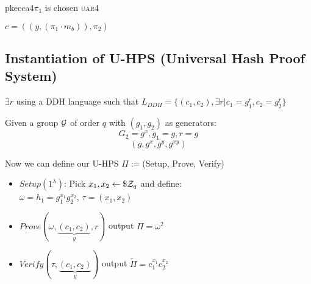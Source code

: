 \begin{cryptogame}{pkecca4}{$\pi_1$ is chosen \textsc{uar}}{4}

    \send{}{}{}
    \receive{}{}{}

    \postlevel

    {$c = ((y, (\pi_1 \cdot m_b)), \pi_2)$}{}

    \postlevel

    \send{}{}{}
    \receive{}{}{}

    \postlevel


\end{cryptogame}



\subsection{Instantiation of U-HPS (Universal Hash Proof System)}
$\exists r$ using a DDH language such that
$L_{DDH}=\{(c_1,c_2), \exists r | c_1=g_1^r, c_2=g_2^r\}$

Given a group $\mathcal{G}$ of order $q$ with $(g_1,g_2)$ as generators:
$$G_2=g^x , g_1=g , r=g $$ $$ (g,g^x,g^y,g^{xy})$$

Now we can define our U-HPS $\Pi:=$(Setup, Prove, Verify)

\begin{itemize}
    \item $Setup(1^\lambda)$: Pick $x_1,x_2 \leftarrow\$ \mathcal{Z}_q$ and define:\\ $\omega=h_1=g_1^{x_1}g_2^{x_2}$, $\tau=(x_1,x_2)$
    \item $Prove(\omega, \underbrace{(c_1,c_2)}_{y}, r)$ output $\Pi=\omega^2$
    \item $Verify(\tau, \underbrace{(c_1,c_2)}_{y})$ output $\widetilde{\Pi}=c_1^{x_1}c_2^{x_2}$ %
\end{itemize}

